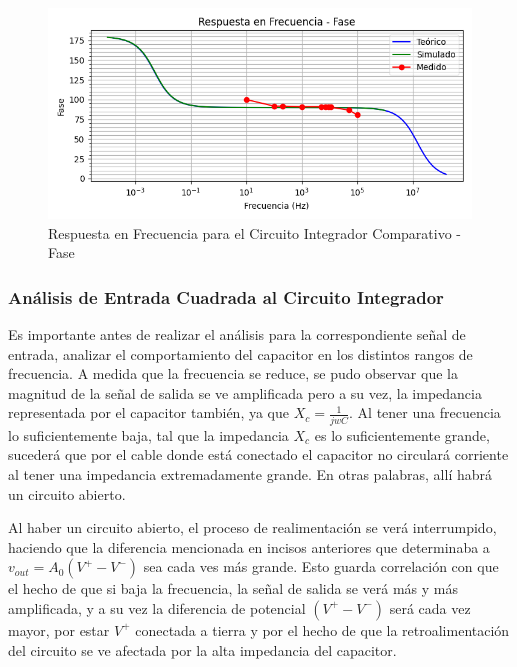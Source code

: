 \begin{figure}[H]
    \centering 
    \includegraphics [scale=1] {../Ejercicio3-CircuitoIntegradoresyDerivadores/Imagenes/comparativo-integrador-fase.png} 
    \caption{Respuesta en Frecuencia para el Circuito Integrador Comparativo - Fase }
    \label{fig:emptyPlotTool}
\end{figure}

\subsubsection{Análisis de Entrada Cuadrada al Circuito Integrador}

Es importante antes de realizar el análisis para la correspondiente señal de entrada, analizar el comportamiento del capacitor en los distintos rangos de frecuencia.
A medida que la frecuencia se reduce, se pudo observar que la magnitud de la señal de salida se ve amplificada pero a su vez, la impedancia representada por el capacitor
también, ya que $X_c= \frac{1}{jwC}$. Al tener una frecuencia lo suficientemente baja, tal que la impedancia $X_c$ es lo suficientemente grande, sucederá que por el cable 
donde está conectado el capacitor no circulará corriente al tener una impedancia extremadamente grande. En otras palabras, allí habrá un circuito abierto.

Al haber un circuito abierto, el proceso de realimentación se verá interrumpido, haciendo que la diferencia mencionada en incisos anteriores que determinaba a 
$v_{out}=A_0(V^+-V^-)$ sea cada ves más grande. Esto guarda correlación con que el hecho de que si baja la frecuencia, la señal de salida se verá más y más amplificada,
y a su vez la diferencia de potencial $(V^+-V^-)$ será cada vez mayor, por estar $V^+$ conectada a tierra y por el hecho de que la retroalimentación del circuito se ve afectada
por la alta impedancia del capacitor.

